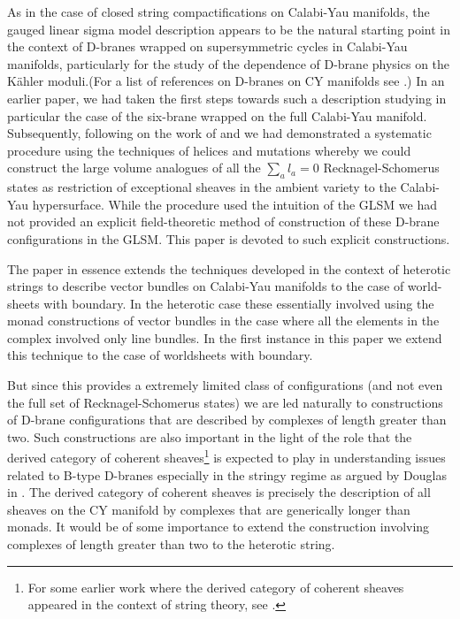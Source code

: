 \documentclass[a4paper,12pt]{article}
\begin{document}
As in the case of closed string compactifications on Calabi-Yau
manifolds, the gauged linear sigma model description 
appears to be the natural starting point 
in the context of
D-branes wrapped on supersymmetric cycles in Calabi-Yau manifolds,
particularly for the study of the
dependence of D-brane physics on the K\"ahler moduli.(For 
a list of references on D-branes on CY manifolds see
\cite{RS,quintic,dgepner,oops}.) In an
earlier paper\cite{lsmone}, we had taken the first steps towards such a
description studying in particular the case of the six-brane wrapped on
the full Calabi-Yau manifold. Subsequently, following on the 
work of
\cite{diacgom} and \cite{dougdiac} we had demonstrated a systematic
procedure using the techniques of helices and mutations whereby we could
construct the large volume analogues of all the $\sum_a l_a=0$
Recknagel-Schomerus states as restriction of 
exceptional sheaves in the ambient variety to the Calabi-Yau
hypersurface\cite{helices}.
While the procedure used the intuition of the GLSM we had
not provided an explicit field-theoretic method of construction of these
D-brane configurations in the GLSM. This paper is devoted to such
explicit constructions. 

The paper in essence extends the techniques developed in the context of
heterotic strings to describe vector bundles on Calabi-Yau manifolds to
the case of world-sheets with boundary. In the heterotic case these
essentially involved using the monad constructions of vector bundles in
the case where all the elements in the complex involved only line
bundles. In the first instance in this paper we extend this technique to
the case of worldsheets with boundary.  

But since this provides a
extremely limited class of configurations (and not even the full set of
Recknagel-Schomerus states) we are led naturally
to constructions of D-brane configurations that are described by
complexes of length greater than two. Such constructions are also
important in the light of the role that the derived category of coherent
sheaves\footnote{For some earlier work where the derived category of coherent
sheaves appeared in the context of string theory, see \cite{cat}.}
is expected to play in understanding issues related to
B-type D-branes especially
in the stringy regime as argued by Douglas in \cite{dougtalk,dougcat}.
The derived category of coherent sheaves is precisely the description of
all sheaves on the CY manifold by complexes that are generically longer
than monads. It would be of some importance to extend the construction
involving complexes of length greater than two to the heterotic string.
\end{document}
